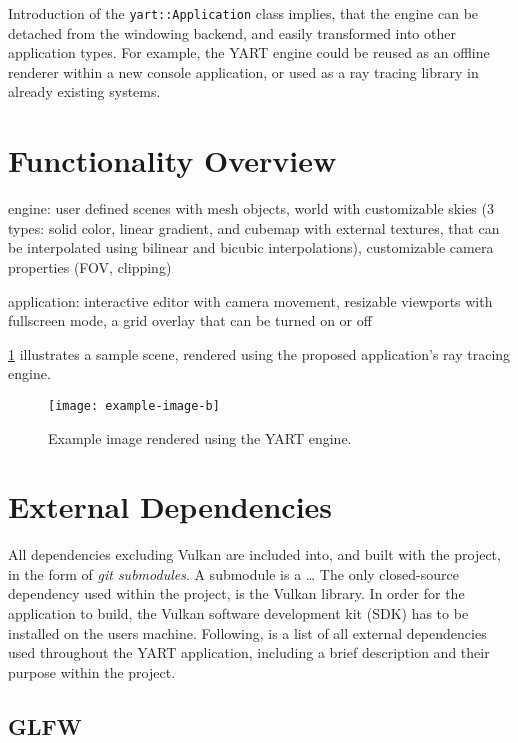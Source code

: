 Introduction of the \verb|yart::Application| class implies, that the engine can be detached from the windowing backend, and easily transformed into other application types.
For example, the YART engine could be reused as an offline renderer within a new console application, or used as a ray tracing library in already existing systems.

\section{Functionality Overview}

engine:
user defined scenes with mesh objects, world with customizable skies (3 types: solid color, linear gradient, and cubemap with external textures, that can be interpolated using bilinear and bicubic interpolations), customizable camera properties (FOV, clipping)

application:
interactive editor with camera movement, resizable viewports with fullscreen mode, a grid overlay that can be turned on or off

\cref{fig:Application/FunctionalityOverview/render_sample} illustrates a sample scene, rendered using the proposed application's ray tracing engine.

\vfill
\begin{figure}[!ht]
    \centering
    \texttt{[image: example-image-b]}
    \caption[Example image rendered using the YART engine]{Example image rendered using the YART engine.}
    \label{fig:Application/FunctionalityOverview/render_sample}
\end{figure}
\vfill

\section{External Dependencies}

All dependencies excluding Vulkan are included into, and built with the project, in the form of \textit{git submodules}. 
A submodule is a \dots
The only closed-source dependency used within the project, is the Vulkan library.
In order for the application to build, the Vulkan software development kit (SDK) has to be installed on the users machine. 
Following, is a list of all external dependencies used throughout the YART application, including a brief description and their purpose within the project.

\subsection{GLFW}

